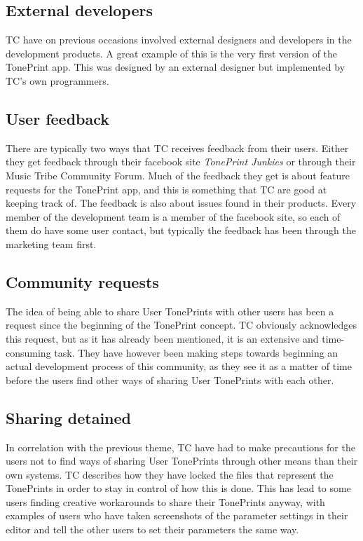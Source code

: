 \subsection*{External developers} 
\label{App:ThemeExternalDevelopers}
TC have on previous occasions involved external designers and developers in the development products. A great example of this is the very first version of the TonePrint app. This was designed by an external designer but implemented by TC's own programmers.

\subsection*{User feedback} 
\label{App:ThemeUserFeedback}
There are typically two ways that TC receives feedback from their users. Either they get feedback through their facebook site \textit{TonePrint Junkies} or through their Music Tribe Community Forum. Much of the feedback they get is about feature requests for the TonePrint app, and this is something that TC are good at keeping track of. The feedback is also about issues found in their products. Every member of the development team is a member of the facebook site, so each of them do have some user contact, but typically the feedback has been through the marketing team first.

\subsection*{Community requests} 
\label{App:ThemeCommunityRequests}
The idea of being able to share User TonePrints with other users has been a request since the beginning of the TonePrint concept. TC obviously acknowledges this request, but as it has already been mentioned, it is an extensive and time-consuming task. They have however been making steps towards beginning an actual development process of this community, as they see it as a matter of time before the users find other ways of sharing User TonePrints with each other.

\subsection*{Sharing detained} 
\label{App:ThemeDetainSharing}
In correlation with the previous theme, TC have had to make precautions for the users not to find ways of sharing User TonePrints through other means than their own systems. TC describes how they have locked the files that represent the TonePrints in order to stay in control of how this is done. This has lead to some users finding creative workarounds to share their TonePrints anyway, with examples of users who have taken screenshots of the parameter settings in their editor and tell the other users to set their parameters the same way.

